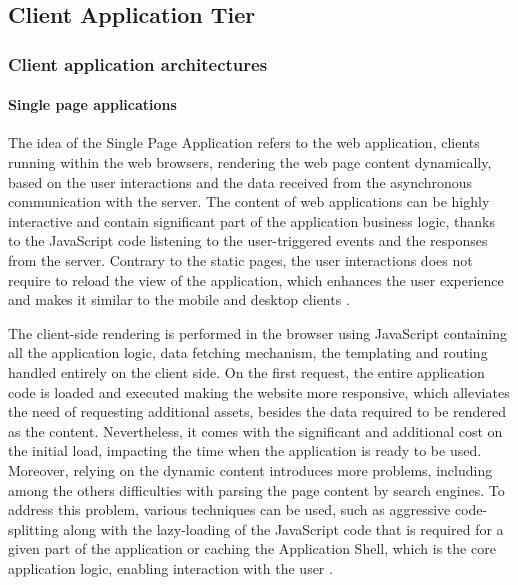 \subsection{Client Application Tier}

\subsubsection{Client application architectures}

\paragraph*{Single page applications}

The idea of the Single Page Application \cite{SPA} refers to the web application, clients running within the web browsers, rendering the web page content dynamically, based on the user interactions and the data received from the asynchronous communication with the server. The content of web applications can be highly interactive and contain significant part of the application business logic, thanks to the JavaScript code listening to the user-triggered events and the responses from the server.
Contrary to the static pages, the user interactions does not require to reload the view of the application, which enhances the user experience and makes it similar to the mobile and desktop clients \cite{PerspectivesOnArchitectureEvolution}.

The client-side rendering is performed in the browser using JavaScript containing all the application logic, data fetching mechanism, the templating and routing handled entirely on the client side. On the first request, the entire application code is loaded and executed making the website more responsive, which alleviates the need of requesting additional assets, besides the data required to be rendered as the content. Nevertheless, it comes with the significant and additional cost on the initial load, impacting the time when the application is ready to be used. Moreover, relying on the dynamic content introduces more problems, including among the others difficulties with parsing the page content by search engines. To address this problem, various techniques can be used, such as aggressive code-splitting along with the lazy-loading of the JavaScript code that is required for a given part of the application or caching the Application Shell, which is the core application logic, enabling interaction with the user \cite{GoogleRenderingOnTheWeb}.

